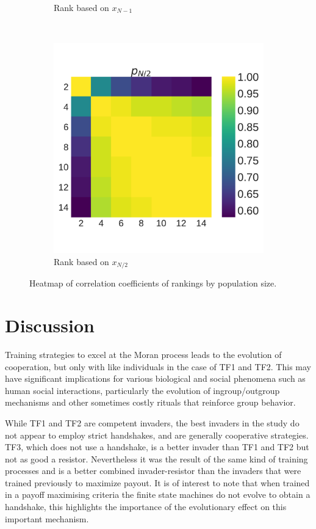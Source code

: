 \documentclass[10pt,letterpaper]{article}
\begin{document}
\begin{figure}[!htbp]
\begin{subfigure}[t]{.3\columnwidth}
        \caption{Rank based on \(x_{N - 1}\)}
    \end{subfigure}
    ~
    \begin{subfigure}[t]{.3\columnwidth}
        \centering
        \includegraphics[width=\columnwidth]{./correlation_heatmap_coexist.pdf}
        \caption{Rank based on \(x_{N/2}\)}
    \end{subfigure}
    \caption{Heatmap of correlation coefficients of rankings by population size.}
    \label{fig:correlation_coefficients}
\end{figure}


\section*{Discussion}

Training strategies to excel
at the Moran process leads to the evolution of cooperation, but only with like
individuals in the case of TF1 and TF2. This may have significant implications
for various biological and social phenomena such as
human social interactions, particularly the evolution of ingroup/outgroup mechanisms
and other sometimes costly rituals that reinforce group behavior.

While TF1 and TF2 are competent invaders, the best invaders
in the study do not appear to employ strict handshakes, and are generally
cooperative strategies. TF3, which does not use a handshake, is a better invader
than TF1 and TF2 but not as good a resistor. Nevertheless it was the result
of the same kind of training processes and is a better combined invader-resistor
than the invaders that were trained previously to maximize payout. It is of
interest to note that when trained in a payoff maximising criteria the finite
state machines do not evolve to obtain a handshake, this highlights the
importance of the evolutionary effect on this important mechanism.
\end{document}
